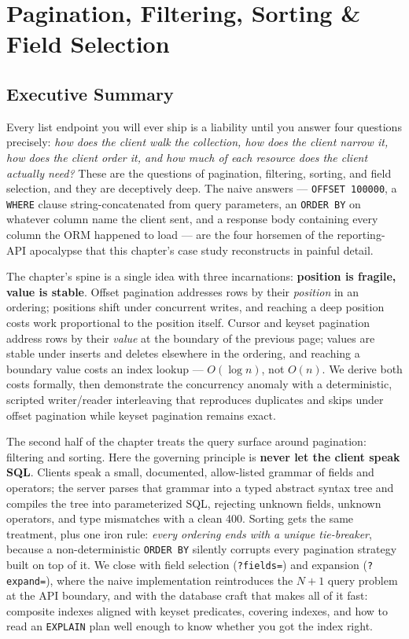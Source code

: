 \chapter{Pagination, Filtering, Sorting \& Field Selection}
\label{ch:pagination}

\section*{Executive Summary}

Every list endpoint you will ever ship is a liability until you answer four
questions precisely: \emph{how does the client walk the collection, how does
the client narrow it, how does the client order it, and how much of each
resource does the client actually need?} These are the questions of
pagination, filtering, sorting, and field selection, and they are deceptively
deep. The naive answers --- \texttt{OFFSET 100000}, a \texttt{WHERE} clause
string-concatenated from query parameters, an \texttt{ORDER BY} on whatever
column name the client sent, and a response body containing every column the
ORM happened to load --- are the four horsemen of the reporting-API apocalypse
that this chapter's case study reconstructs in painful detail.

The chapter's spine is a single idea with three incarnations:
\textbf{position is fragile, value is stable}. Offset pagination addresses
rows by their \emph{position} in an ordering; positions shift under
concurrent writes, and reaching a deep position costs work proportional to
the position itself. Cursor and keyset pagination address rows by their
\emph{value} at the boundary of the previous page; values are stable under
inserts and deletes elsewhere in the ordering, and reaching a boundary value
costs an index lookup --- $O(\log n)$, not $O(n)$. We derive both costs
formally, then demonstrate the concurrency anomaly with a deterministic,
scripted writer/reader interleaving that reproduces duplicates and skips
under offset pagination while keyset pagination remains exact.

The second half of the chapter treats the query surface around pagination:
filtering and sorting. Here the governing principle is \textbf{never let the
client speak SQL}. Clients speak a small, documented, allow-listed grammar of
fields and operators; the server parses that grammar into a typed abstract
syntax tree and compiles the tree into parameterized SQL, rejecting unknown
fields, unknown operators, and type mismatches with a clean 400. Sorting gets
the same treatment, plus one iron rule: \emph{every ordering ends with a
unique tie-breaker}, because a non-deterministic \texttt{ORDER BY} silently
corrupts every pagination strategy built on top of it. We close with field
selection (\texttt{?fields=}) and expansion (\texttt{?expand=}), where the
naive implementation reintroduces the $N{+}1$ query problem at the API
boundary, and with the database craft that makes all of it fast: composite
indexes aligned with keyset predicates, covering indexes, and how to read an
\texttt{EXPLAIN} plan well enough to know whether you got the index right.

